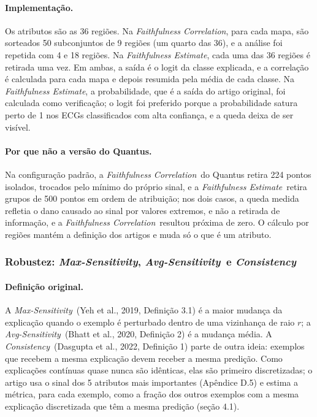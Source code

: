 \documentclass[11pt,a4paper]{article}
\newcommand{\FC}{\textit{Faithfulness Correlation}}
\newcommand{\FE}{\textit{Faithfulness Estimate}}
\newcommand{\MS}{\textit{Max-Sensitivity}}
\newcommand{\AS}{\textit{Avg-Sensitivity}}
\newcommand{\CS}{\textit{Consistency}}
\begin{document}
\paragraph{Implementação.} Os atributos são as 36 regiões. Na \FC, para cada mapa, são sorteados 50 subconjuntos de 9 regiões (um quarto das 36), e a análise foi repetida com 4 e 18 regiões. Na \FE, cada uma das 36 regiões é retirada uma vez. Em ambas, a saída é o logit da classe explicada, e a correlação é calculada para cada mapa e depois resumida pela média de cada classe. Na \FE, a probabilidade, que é a saída do artigo original, foi calculada como verificação; o logit foi preferido porque a probabilidade satura perto de 1 nos ECGs classificados com alta confiança, e a queda deixa de ser visível.

\paragraph{Por que não a versão do Quantus.} Na configuração padrão, a \FC\ do Quantus retira 224 pontos isolados, trocados pelo mínimo do próprio sinal, e a \FE\ retira grupos de 500 pontos em ordem de atribuição; nos dois casos, a queda medida refletia o dano causado ao sinal por valores extremos, e não a retirada de informação, e a \FC\ resultou próxima de zero. O cálculo por regiões mantém a definição dos artigos e muda só o que é um atributo.

\subsubsection{Robustez: \MS, \AS\ e \CS}
\paragraph{Definição original.} A \MS\ (Yeh et al., 2019, Definição 3.1) é a maior mudança da explicação quando o exemplo é perturbado dentro de uma vizinhança de raio $r$; a \AS\ (Bhatt et al., 2020, Definição 2) é a mudança média. A \CS\ (Dasgupta et al., 2022, Definição 1) parte de outra ideia: exemplos que recebem a mesma explicação devem receber a mesma predição. Como explicações contínuas quase nunca são idênticas, elas são primeiro discretizadas; o artigo usa o sinal dos 5 atributos mais importantes (Apêndice D.5) e estima a métrica, para cada exemplo, como a fração dos outros exemplos com a mesma explicação discretizada que têm a mesma predição (seção 4.1).
\end{document}
